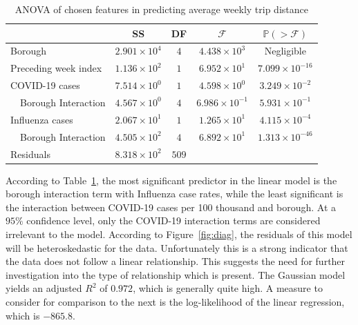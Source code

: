 \documentclass[11pt]{article}
\begin{document}
\begin{table}[H]
    \centering
    \caption{ANOVA of chosen features in predicting average weekly trip distance}
    \label{tbl:anova1}
    \begin{tabular}{llcccc}
    \hline
                  &                                     & SS                        & DF            & $\mathcal{F}$             & $\mathbb{P}(>\mathcal{F})$        \\ \hline
    \multicolumn{2}{l}{Borough}                         & $2.901 \times 10^{4}$     & $4  $         & $4.438 \times 10^{3}$     & Negligible          \\ \hline
    \multicolumn{2}{l}{Preceding week index}            & $1.136 \times 10^{2}$     & $1  $         & $6.952 \times 10^{1}$     & $7.099 \times 10^{-16 }$          \\ \hline
    \multicolumn{2}{l}{COVID-19 cases}                  & $7.514 \times 10^{0}$     & $1  $         & $4.598 \times 10^{0}$     & $3.249 \times 10^{-2  }$          \\ \hline
                  & Borough Interaction                 & $4.567 \times 10^{0}$     & $4  $         & $6.986 \times 10^{-1}$    & $5.931 \times 10^{-1  }$          \\ \hline
    \multicolumn{2}{l}{Influenza cases}                 & $2.067 \times 10^{1}$     & $1  $         & $1.265 \times 10^{1}$     & $4.115 \times 10^{-4  }$          \\ \hline
                  & Borough Interaction                 & $4.505 \times 10^{2}$     & $4  $         & $6.892 \times 10^{1}$     & $1.313 \times 10^{-46 }$          \\ \hline
    \multicolumn{2}{l}{Residuals}                       & $8.318 \times 10^{2}$     & $509$         &                           &                                   \\ \hline
    \end{tabular}
\end{table}

    According to Table~\ref{tbl:anova1}, the most significant predictor in the linear model is the borough
    interaction term with Influenza case rates,
    while the least significant is the interaction between COVID-19 cases per 100 thousand and borough.
    At a $95\%$ confidence level, only the COVID-19 interaction terms are considered irrelevant to the model.
    According to Figure~\ref{fig:diag}, the residuals of this model will be heteroskedastic for the data.
    Unfortunately this is a strong indicator that the data does not follow a linear relationship.
    This suggests the need for further investigation into the type of relationship which is present.
    The Gaussian model yields an adjusted $R^2$ of $0.972$, which is generally quite high.
    A measure to consider for comparison to the next is the log-likelihood of the linear regression,
    which is $-865.8$.
\end{document}
